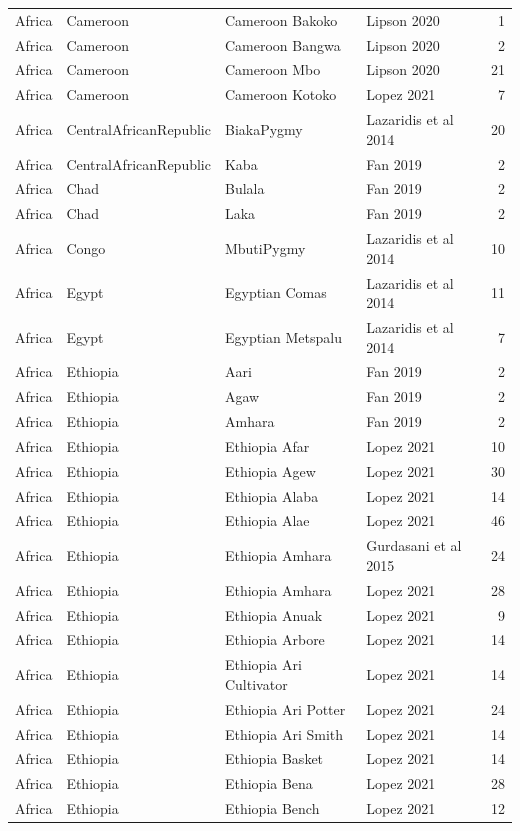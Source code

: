 \begin{longtable}[t]{lll>{\raggedright\arraybackslash}p{9em}r}
Africa & Cameroon & Cameroon Bakoko & Lipson 2020 & 1\\
Africa & Cameroon & Cameroon Bangwa & Lipson 2020 & 2\\
Africa & Cameroon & Cameroon Mbo & Lipson 2020 & 21\\
Africa & Cameroon & Cameroon Kotoko & Lopez 2021 & 7\\
Africa & CentralAfricanRepublic & BiakaPygmy & Lazaridis et al 2014 & 20\\
Africa & CentralAfricanRepublic & Kaba & Fan 2019 & 2\\
Africa & Chad & Bulala & Fan 2019 & 2\\
Africa & Chad & Laka & Fan 2019 & 2\\
Africa & Congo & MbutiPygmy & Lazaridis et al 2014 & 10\\
Africa & Egypt & Egyptian Comas & Lazaridis et al 2014 & 11\\
Africa & Egypt & Egyptian Metspalu & Lazaridis et al 2014 & 7\\
Africa & Ethiopia & Aari & Fan 2019 & 2\\
Africa & Ethiopia & Agaw & Fan 2019 & 2\\
Africa & Ethiopia & Amhara & Fan 2019 & 2\\
Africa & Ethiopia & Ethiopia Afar & Lopez 2021 & 10\\
Africa & Ethiopia & Ethiopia Agew & Lopez 2021 & 30\\
Africa & Ethiopia & Ethiopia Alaba & Lopez 2021 & 14\\
Africa & Ethiopia & Ethiopia Alae & Lopez 2021 & 46\\
Africa & Ethiopia & Ethiopia Amhara & Gurdasani et al 2015 & 24\\
Africa & Ethiopia & Ethiopia Amhara & Lopez 2021 & 28\\
Africa & Ethiopia & Ethiopia Anuak & Lopez 2021 & 9\\
Africa & Ethiopia & Ethiopia Arbore & Lopez 2021 & 14\\
Africa & Ethiopia & Ethiopia Ari Cultivator & Lopez 2021 & 14\\
Africa & Ethiopia & Ethiopia Ari Potter & Lopez 2021 & 24\\
Africa & Ethiopia & Ethiopia Ari Smith & Lopez 2021 & 14\\
Africa & Ethiopia & Ethiopia Basket & Lopez 2021 & 14\\
Africa & Ethiopia & Ethiopia Bena & Lopez 2021 & 28\\
Africa & Ethiopia & Ethiopia Bench & Lopez 2021 & 12\\

\end{longtable}
